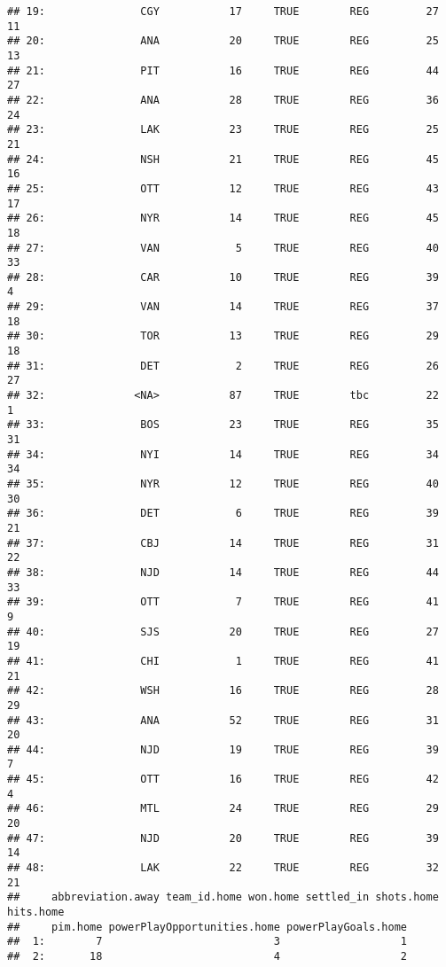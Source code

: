 \documentclass[
]{article}
\begin{document}
\begin{verbatim}
## 19:               CGY           17     TRUE        REG         27        11
## 20:               ANA           20     TRUE        REG         25        13
## 21:               PIT           16     TRUE        REG         44        27
## 22:               ANA           28     TRUE        REG         36        24
## 23:               LAK           23     TRUE        REG         25        21
## 24:               NSH           21     TRUE        REG         45        16
## 25:               OTT           12     TRUE        REG         43        17
## 26:               NYR           14     TRUE        REG         45        18
## 27:               VAN            5     TRUE        REG         40        33
## 28:               CAR           10     TRUE        REG         39         4
## 29:               VAN           14     TRUE        REG         37        18
## 30:               TOR           13     TRUE        REG         29        18
## 31:               DET            2     TRUE        REG         26        27
## 32:              <NA>           87     TRUE        tbc         22         1
## 33:               BOS           23     TRUE        REG         35        31
## 34:               NYI           14     TRUE        REG         34        34
## 35:               NYR           12     TRUE        REG         40        30
## 36:               DET            6     TRUE        REG         39        21
## 37:               CBJ           14     TRUE        REG         31        22
## 38:               NJD           14     TRUE        REG         44        33
## 39:               OTT            7     TRUE        REG         41         9
## 40:               SJS           20     TRUE        REG         27        19
## 41:               CHI            1     TRUE        REG         41        21
## 42:               WSH           16     TRUE        REG         28        29
## 43:               ANA           52     TRUE        REG         31        20
## 44:               NJD           19     TRUE        REG         39         7
## 45:               OTT           16     TRUE        REG         42         4
## 46:               MTL           24     TRUE        REG         29        20
## 47:               NJD           20     TRUE        REG         39        14
## 48:               LAK           22     TRUE        REG         32        21
##     abbreviation.away team_id.home won.home settled_in shots.home hits.home
##     pim.home powerPlayOpportunities.home powerPlayGoals.home
##  1:        7                           3                   1
##  2:       18                           4                   2

\end{verbatim}
\end{document}

